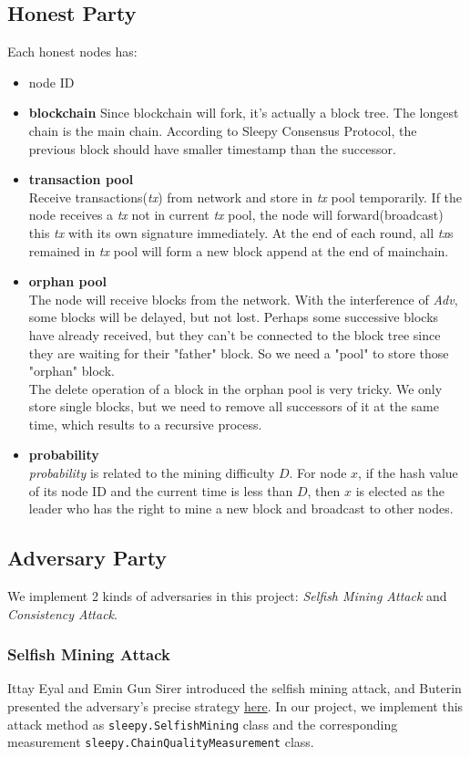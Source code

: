 \documentclass[
10pt, %
a4paper, %
oneside, %
headinclude,footinclude, %
BCOR5mm, %
]{scrartcl}
\begin{document}
\subsection{Honest Party}
Each honest nodes has:
\begin{itemize}
\item node ID
\item \textbf{blockchain} Since blockchain will fork, it's actually a block tree. The longest chain is the main chain. According to Sleepy Consensus Protocol, the previous block should have smaller timestamp than the successor.
\item \textbf{transaction pool}\\
Receive transactions(\textit{tx}) from network and store in \textit{tx} pool temporarily. If the node receives a \textit{tx} not in current \textit{tx} pool, the node will forward(broadcast) this \textit{tx} with its own signature immediately. At the end of each round, all \textit{tx}s remained in \textit{tx} pool will form a new block append at the end of mainchain. 
\item    \textbf{orphan pool}\\ 
The node will receive blocks from the network. With the interference of \textit{Adv}, some blocks will be delayed, but not lost. Perhaps some successive blocks have already received, but they can't be connected to the block tree since they are waiting for their "father" block. So we need a "pool" to store those "orphan" block.\\
The delete operation of a block in the orphan pool is very tricky. We only store single blocks, but we need to remove all successors of it at the same time, which results to a recursive process. 

\item \textbf{probability}\\
\textit{probability} is related to the mining difficulty $D$. For node $x$, if the hash value of its node ID and the current time is less than $D$, then $x$ is elected as the leader who has the right to mine a new block and broadcast to other nodes.
\end{itemize}

\subsection{Adversary Party}
We implement 2 kinds of adversaries in this project: \textit{Selfish Mining Attack} and \textit{Consistency Attack}.
\subsubsection{Selfish Mining Attack}
Ittay Eyal and Emin Gun Sirer\cite{DBLP:journals/corr/EyalS13} introduced the selfish mining attack, and Buterin presented the adversary's precise strategy \href{https://bitcoinmagazine.com/articles/selfish-mining-a-25-attack-against-the-bitcoin-network-1383578440/}{here}. In our project, we implement this attack method as \verb|sleepy.SelfishMining| class and the corresponding measurement \verb|sleepy.ChainQualityMeasurement| class.
\end{document}
